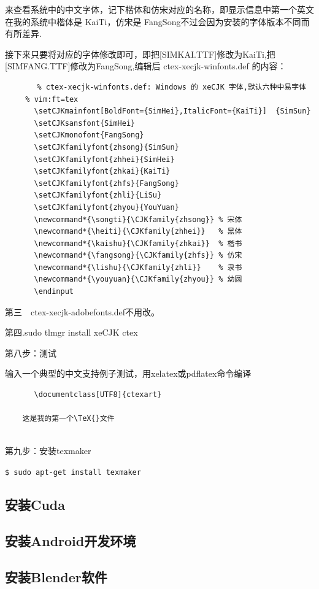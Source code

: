 来查看系统中的中文字体，记下楷体和仿宋对应的名称，即显示信息中第一个英文在我的系统中楷体是 KaiTi，仿宋是 FangSong不过会因为安装的字体版本不同而有所差异.

接下来只要将对应的字体修改即可，即把[SIMKAI.TTF]修改为KaiTi,把[SIMFANG.TTF]修改为FangSong,编辑后 ctex-xecjk-winfonts.def 的内容：
\begin{verbatim}
    　　% ctex-xecjk-winfonts.def: Windows 的 xeCJK 字体,默认六种中易字体
　	% vim:ft=tex
　　　　\setCJKmainfont[BoldFont={SimHei},ItalicFont={KaiTi}]  {SimSun}
　　　　\setCJKsansfont{SimHei}
　　　　\setCJKmonofont{FangSong}
　　　　\setCJKfamilyfont{zhsong}{SimSun}
　　　　\setCJKfamilyfont{zhhei}{SimHei}
　　　　\setCJKfamilyfont{zhkai}{KaiTi}
　　　　\setCJKfamilyfont{zhfs}{FangSong}
　　　　\setCJKfamilyfont{zhli}{LiSu}
　　　　\setCJKfamilyfont{zhyou}{YouYuan}
　　　　\newcommand*{\songti}{\CJKfamily{zhsong}} % 宋体
　　　　\newcommand*{\heiti}{\CJKfamily{zhhei}}   % 黑体
　　　　\newcommand*{\kaishu}{\CJKfamily{zhkai}}  % 楷书
　　　　\newcommand*{\fangsong}{\CJKfamily{zhfs}} % 仿宋
　　　　\newcommand*{\lishu}{\CJKfamily{zhli}}    % 隶书
　　　　\newcommand*{\youyuan}{\CJKfamily{zhyou}} % 幼圆
　　　　\endinput
\end{verbatim}

第三　ctex-xecjk-adobefonts.def不用改。

第四.sudo   tlmgr   install   xeCJK   ctex

第八步：测试

输入一个典型的中文支持例子测试，用xelatex或pdflatex命令编译
\begin{verbatim}
　　　　\documentclass[UTF8]{ctexart}　　　　
	　　　　
	这是我的第一个\TeX{}文件　　　　
	
\end{verbatim}

第九步：安装texmaker

\verb"$ sudo apt-get install texmaker"

\subsection{安装Cuda}

\subsection{安装Android开发环境}

\subsection{安装Blender软件}

